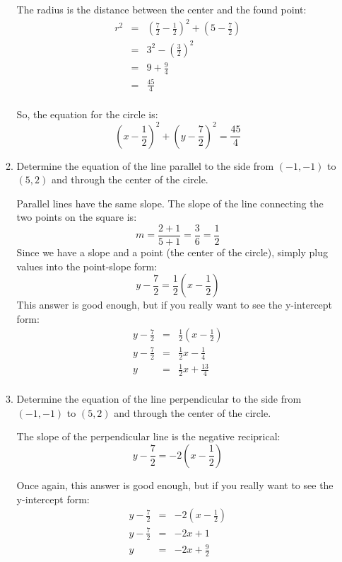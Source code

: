 \documentclass[letterpaper,12pt,fleqn]{article}
\begin{document}
\begin{enumerate}
\begin{enumerate}
    The radius is the distance between the center and the found point:
    \begin{eqnarray*}
      r^2 &=& \left(\frac{7}{2}-\frac{1}{2}\right)^2+
        \left(5-\frac{7}{2}\right) \\
      &=& 3^2-\left(\frac{3}{2}\right)^2 \\
      &=& 9+\frac{9}{4} \\
      &=& \frac{45}{4} \\
    \end{eqnarray*}

    So, the equation for the circle is:
    \[\left(x-\frac{1}{2}\right)^2+\left(y-\frac{7}{2}\right)^2=\frac{45}{4}\]
    
  \item Determine the equation of the line parallel to the side from
    $(-1,-1)$ to $(5,2)$ and through the center of the circle.

    Parallel lines have the same slope. The slope of the line connecting the
    two points on the square is:
    \[m=\frac{2+1}{5+1}=\frac{3}{6}=\frac{1}{2}\]
    Since we have a slope and a point (the center of the circle), simply plug
    values into the point-slope form:
    \[y-\frac{7}{2}=\frac{1}{2}\left(x-\frac{1}{2}\right)\]
    This answer is good enough, but if you really want to see the y-intercept
    form:
    \begin{eqnarray}
      y-\frac{7}{2} &=& \frac{1}{2}\left(x-\frac{1}{2}\right) \\
      y-\frac{7}{2} &=& \frac{1}{2}x-\frac{1}{4} \\
      y &=& \frac{1}{2}x+\frac{13}{4} \\
    \end{eqnarray}
    
  \item Determine the equation of the line perpendicular to the side from
    $(-1,-1)$ to $(5,2)$ and through the center of the circle.

    The slope of the perpendicular line is the negative reciprical:
    \[y-\frac{7}{2}=-2\left(x-\frac{1}{2}\right)\]

    Once again, this answer is good enough, but if you really want to see the
    y-intercept form:
    \begin{eqnarray}
      y-\frac{7}{2} &=& -2\left(x-\frac{1}{2}\right) \\
      y-\frac{7}{2} &=& -2x+1 \\
      y &=& -2x+\frac{9}{2} \\
    \end{eqnarray}
  \end{enumerate}


\end{enumerate}
\end{document}
